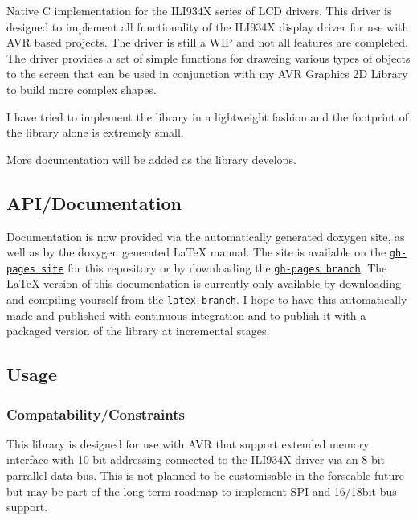 Native C implementation for the I\+L\+I934\+X series of L\+C\+D drivers. This driver is designed to implement all functionality of the I\+L\+I934\+X display driver for use with A\+V\+R based projects. The driver is still a W\+I\+P and not all features are completed. The driver provides a set of simple functions for draweing various types of objects to the screen that can be used in conjunction with my A\+V\+R Graphics 2\+D Library to build more complex shapes.

I have tried to implement the library in a lightweight fashion and the footprint of the library alone is extremely small.

More documentation will be added as the library develops.

\subsection*{A\+P\+I/\+Documentation }

Documentation is now provided via the automatically generated doxygen site, as well as by the doxygen generated La\+Te\+X manual. The site is available on the \href{http://flungo-avr.github.io/ili934x-driver/}{\tt gh-\/pages site} for this repository or by downloading the \href{https://github.com/flungo-avr/ili934x-driver/tree/gh-pages}{\tt gh-\/pages branch}. The La\+Te\+X version of this documentation is currently only available by downloading and compiling yourself from the \href{https://github.com/flungo-avr/ili934x-driver/tree/latex}{\tt latex branch}. I hope to have this automatically made and published with continuous integration and to publish it with a packaged version of the library at incremental stages.

\subsection*{Usage }

\subsubsection*{Compatability/\+Constraints}

This library is designed for use with A\+V\+R that support extended memory interface with 10 bit addressing connected to the I\+L\+I934\+X driver via an 8 bit parrallel data bus. This is not planned to be customisable in the forseable future but may be part of the long term roadmap to implement S\+P\+I and 16/18bit bus support.

